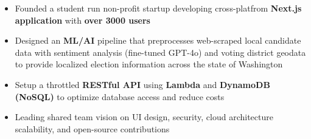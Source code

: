 \begin{itemize}
    \item Founded a student run non-profit startup developing cross-platfrom \textbf{Next.js application} with \textbf{over 3000 users}
    \item Designed an \textbf{ML/AI} pipeline that preprocesses web-scraped local candidate data with sentiment analysis (fine-tuned
    GPT-4o) and voting district geodata to provide localized election information across the state of Washington
    \item Setup a throttled \textbf{RESTful API} using \textbf{Lambda} and \textbf{DynamoDB (NoSQL)} to optimize database access and reduce costs
    \item Leading shared team vision on UI design, security, cloud architecture scalability, and open-source contributions
\end{itemize}
